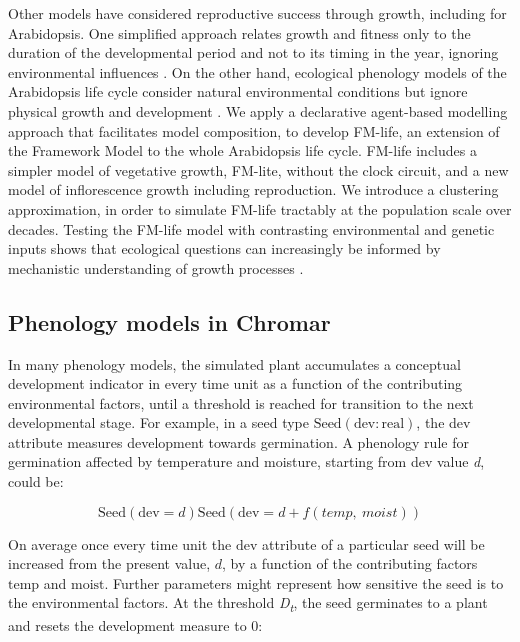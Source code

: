 \documentclass[phd]{infthesis}
\begin{document}
Other models have considered reproductive success through growth, including for
Arabidopsis. One simplified approach relates growth and fitness only to the
duration of the developmental period and not to its timing in the year, ignoring
environmental influences \citep{prusinkiewicz_evolution_2007}. On the other
hand, ecological phenology models of the Arabidopsis life cycle consider natural
environmental conditions but ignore physical growth and development
\citep{chuine_phenology_2001, chuine_why_2010,burghardt_modeling_2015}. We apply
a declarative agent-based modelling approach that facilitates model composition,
to develop FM-life, an extension of the Framework Model to the whole Arabidopsis
life cycle. FM-life includes a simpler model of vegetative growth, FM-lite,
without the clock circuit, and a new model of inflorescence growth including
reproduction. We introduce a clustering approximation, in order to simulate
FM-life tractably at the population scale over decades. Testing the FM-life
model with contrasting environmental and genetic inputs shows that ecological
questions can increasingly be informed by mechanistic understanding of growth
processes \citep{millar_intracellular_2016, doebeli_towards_2017}.

\subsection{Phenology models in Chromar}
\label{phenology-models-in-chromar}
In many phenology models, the simulated plant accumulates a conceptual
development indicator in every time unit as a function of the
contributing environmental factors, until a threshold is reached for
transition to the next developmental stage. For example, in a seed type
\(\text{Seed}(\text{dev}:\text{real})\), the dev attribute measures
development towards germination. A phenology rule for germination
affected by temperature and moisture, starting from dev value \emph{d},
could be:

\[\text{Seed}\left( \text{dev} = d \right){}\text{Seed}(\text{dev} = d + f\left( temp,\ moist \right))\]

On average once every time unit the \(\text{dev}\) attribute of a
particular seed will be increased from the present value, \(d\), by a
function of the contributing factors \(\text{temp}\) and
\(\text{moist}\). Further parameters might represent how sensitive the
seed is to the environmental factors. At the threshold
\emph{D\textsubscript{t}}, the seed germinates to a plant and resets the
development measure to 0:
\end{document}
